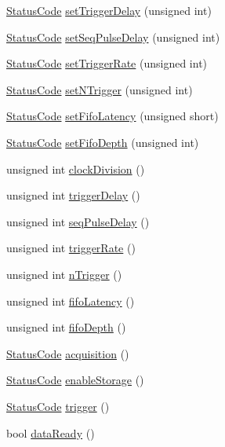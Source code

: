 \begin{DoxyCompactItemize}
\item 
\hyperlink{classStatusCode}{StatusCode} \hyperlink{classA3PE_a6a63fc9503e0aa89ee9928fc7222ce0f}{setTriggerDelay} (unsigned int)
\item 
\hyperlink{classStatusCode}{StatusCode} \hyperlink{classA3PE_af34831e9776a000f833a610ea999a564}{setSeqPulseDelay} (unsigned int)
\item 
\hyperlink{classStatusCode}{StatusCode} \hyperlink{classA3PE_a1ae8e5a69e17d6b3157779544fa14c75}{setTriggerRate} (unsigned int)
\item 
\hyperlink{classStatusCode}{StatusCode} \hyperlink{classA3PE_a81db44ddfc42b67ed08756b113b8e122}{setNTrigger} (unsigned int)
\item 
\hyperlink{classStatusCode}{StatusCode} \hyperlink{classA3PE_a969469569005dfb130aca674de5dacff}{setFifoLatency} (unsigned short)
\item 
\hyperlink{classStatusCode}{StatusCode} \hyperlink{classA3PE_a4d8f78a1b09b409f288b34d503c71146}{setFifoDepth} (unsigned int)
\item 
unsigned int \hyperlink{classA3PE_a81e32c82ca14f85fd7f26cd9a54f7a38}{clockDivision} ()
\item 
unsigned int \hyperlink{classA3PE_ac0aabc1457923b7ee7da0a2c91c46451}{triggerDelay} ()
\item 
unsigned int \hyperlink{classA3PE_acce23c9abd4f434c8c5965351f5ceef0}{seqPulseDelay} ()
\item 
unsigned int \hyperlink{classA3PE_ada46375753047d6a74acdec442044f39}{triggerRate} ()
\item 
unsigned int \hyperlink{classA3PE_a3398fa3ce59a4b1b946e7b4ab4912580}{nTrigger} ()
\item 
unsigned int \hyperlink{classA3PE_a7f6959a6a38c16fa6609560827413764}{fifoLatency} ()
\item 
unsigned int \hyperlink{classA3PE_a8bb523e4a7a5dbb6ab3c5549ebf6db86}{fifoDepth} ()
\item 
\hyperlink{classStatusCode}{StatusCode} \hyperlink{classA3PE_a035886b99761cc4f3c342ff0b4e44f59}{acquisition} ()
\item 
\hyperlink{classStatusCode}{StatusCode} \hyperlink{classA3PE_a2071d7922f140ee6705da954efb685f7}{enableStorage} ()
\item 
\hyperlink{classStatusCode}{StatusCode} \hyperlink{classA3PE_a75cd0377eb653ed22c4d258ab359f3d6}{trigger} ()
\item 
bool \hyperlink{classA3PE_a55df064c578bbc1e80a3b5fc05933f27}{dataReady} ()
\item 

\end{DoxyCompactItemize}
